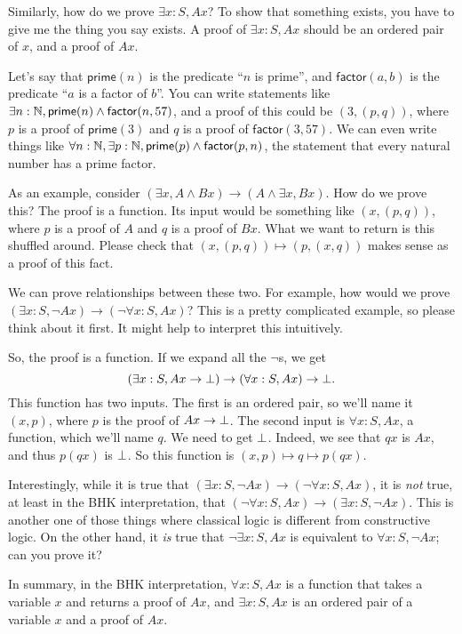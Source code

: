 \documentclass[11pt,paper=letter]{scrartcl}
\renewcommand{\sf}{\mathsf}
\renewcommand{\land}{\wedge}
\renewcommand{\lnot}{\neg}
\begin{document}
Similarly, how do we prove $\exists x: S, Ax$? To show that something exists, you have to give me the thing you say exists. A proof of $\exists x: S, Ax$ should be an ordered pair of $x$, and a proof of $Ax$.

Let's say that $\sf{prime}(n)$ is the predicate ``$n$ is prime'', and $\sf{factor}(a, b)$ is the predicate ``$a$ is a factor of $b$''. You can write statements like $\exists n: \NN, \sf{prime}(n) \land \sf{factor}(n, 57)$, and a proof of this could be $(3, (p, q))$, where $p$ is a proof of $\sf{prime}(3)$ and $q$ is a proof of $\sf{factor}(3, 57)$. We can even write things like $\forall n: \NN, \exists p: \NN, \sf{prime}(p) \land \sf{factor}(p, n)$, the statement that every natural number has a prime factor.

As an example, consider $(\exists x, A \land Bx) \to (A \land \exists x, Bx)$. How do we prove this? The proof is a function. Its input would be something like $(x, (p, q))$, where $p$ is a proof of $A$ and $q$ is a proof of $Bx$. What we want to return is this shuffled around. Please check that $(x, (p, q)) \mapsto (p, (x, q))$ makes sense as a proof of this fact.

We can prove relationships between these two. For example, how would we prove $(\exists x: S, \lnot Ax) \to (\lnot \forall x: S, Ax)$?  This is a pretty complicated example, so please think about it first. It might help to interpret this intuitively.

So, the proof is a function. If we expand all the $\lnot$s, we get \[
(\exists x: S, Ax \to \bot) \to (\forall x: S, Ax) \to \bot.\] This function has two inputs. The first is an ordered pair, so we'll name it $(x, p)$, where $p$ is the proof of $Ax \to \bot$. The second input is $\forall x: S, Ax$, a function, which we'll name $q$. We need to get $\bot$. Indeed, we see that $qx$ is $Ax$, and thus $p(qx)$ is $\bot$. So this function is $(x, p) \mapsto q \mapsto p(qx)$.

Interestingly, while it is true that $(\exists x: S, \lnot Ax) \to (\lnot \forall x:S, Ax)$, it is \emph{not} true, at least in the BHK interpretation, that $(\lnot \forall x:S, Ax) \to (\exists x: S, \lnot Ax)$. This is another one of those things where classical logic is different from constructive logic. On the other hand, it \emph{is} true that $\lnot \exists x: S, Ax$ is equivalent to $\forall x: S, \lnot Ax$; can you prove it?

In summary, in the BHK interpretation, $\forall x:S, Ax$ is a function that takes a variable $x$ and returns a proof of $Ax$, and $\exists x:S, Ax$ is an ordered pair of a variable $x$ and a proof of $Ax$.
\end{document}
